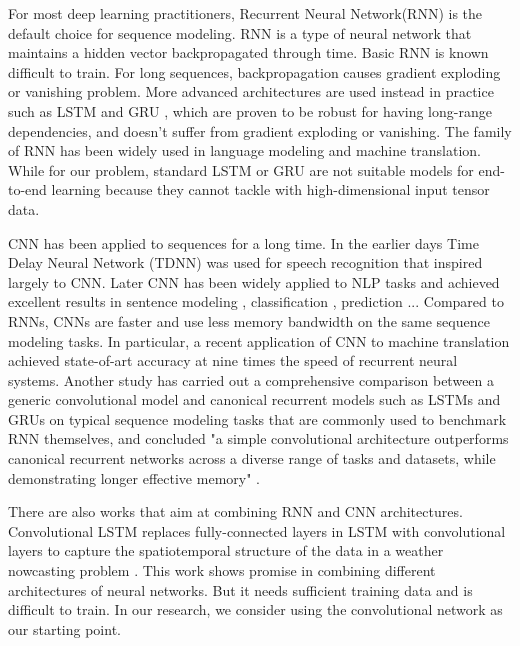 For most deep learning practitioners, Recurrent Neural Network(RNN) is the default choice for sequence modeling. RNN is a type of neural network that maintains a hidden vector backpropagated through time. Basic RNN is known difficult to train. For long sequences, backpropagation causes gradient exploding or vanishing problem. More advanced architectures are used instead in practice such as LSTM\cite{hochreiter1997long} and GRU \cite{collobert2008unified}, which are proven to be robust for having long-range dependencies, and doesn't suffer from gradient exploding or vanishing. The family of RNN has been widely used in language modeling\cite{graves2013generating} and machine translation\cite{sutskever2014sequence}.  While for our problem, standard LSTM or GRU are not suitable models for end-to-end learning because they cannot tackle with high-dimensional input tensor data. 

CNN has been applied to sequences for a long time. In the earlier days Time Delay Neural Network (TDNN) was used for speech recognition \cite{waibel1990phoneme} that inspired largely to CNN. Later CNN has been widely applied to NLP tasks and achieved excellent results in sentence modeling \cite{kalchbrenner2014convolutional}, classification \cite{kim2014convolutional}, prediction \cite{collobert2008unified}... Compared to RNNs, CNNs are faster and use less memory bandwidth on the same sequence modeling tasks. In particular, a recent application of CNN to machine translation \cite{gehring2017convolutional} achieved state-of-art accuracy at nine times the speed of recurrent neural systems. Another study has carried out a comprehensive comparison between a generic convolutional model and canonical recurrent models such as LSTMs and GRUs on typical sequence modeling tasks that are commonly used to benchmark RNN themselves, and concluded "a simple convolutional architecture outperforms canonical recurrent networks across a diverse range of tasks and datasets, while demonstrating longer effective memory" \cite{bai2018empirical}. 

There are also works that aim at combining RNN and CNN architectures. Convolutional LSTM replaces fully-connected layers in LSTM with convolutional layers to capture the spatiotemporal structure of the data in a weather nowcasting problem \cite{xingjian2015convolutional}. This work shows promise in combining different architectures of neural networks. But it needs sufficient training data and is difficult to train. In our research, we consider using the convolutional network as our starting point.


